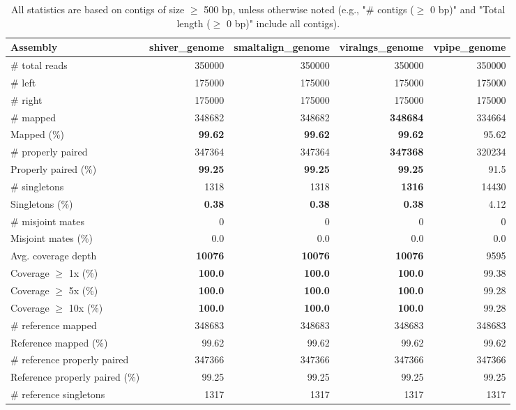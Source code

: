 \documentclass[12pt,a4paper]{article}
\begin{document}
\begin{table}[ht]
\begin{center}
\caption{All statistics are based on contigs of size $\geq$ 500 bp, unless otherwise noted (e.g., "\# contigs ($\geq$ 0 bp)" and "Total length ($\geq$ 0 bp)" include all contigs).}
\begin{tabular}{|l*{4}{|r}|}
\hline
Assembly & shiver\_genome & smaltalign\_genome & viralngs\_genome & vpipe\_genome \\ \hline
\# total reads & 350000 & 350000 & 350000 & 350000 \\ \hline
\# left & 175000 & 175000 & 175000 & 175000 \\ \hline
\# right & 175000 & 175000 & 175000 & 175000 \\ \hline
\# mapped & 348682 & 348682 & {\bf 348684} & 334664 \\ \hline
Mapped (\%) & {\bf 99.62} & {\bf 99.62} & {\bf 99.62} & 95.62 \\ \hline
\# properly paired & 347364 & 347364 & {\bf 347368} & 320234 \\ \hline
Properly paired (\%) & {\bf 99.25} & {\bf 99.25} & {\bf 99.25} & 91.5 \\ \hline
\# singletons & 1318 & 1318 & {\bf 1316} & 14430 \\ \hline
Singletons (\%) & {\bf 0.38} & {\bf 0.38} & {\bf 0.38} & 4.12 \\ \hline
\# misjoint mates & 0 & 0 & 0 & 0 \\ \hline
Misjoint mates (\%) & 0.0 & 0.0 & 0.0 & 0.0 \\ \hline
Avg. coverage depth & {\bf 10076} & {\bf 10076} & {\bf 10076} & 9595 \\ \hline
Coverage $\geq$ 1x (\%) & {\bf 100.0} & {\bf 100.0} & {\bf 100.0} & 99.38 \\ \hline
Coverage $\geq$ 5x (\%) & {\bf 100.0} & {\bf 100.0} & {\bf 100.0} & 99.28 \\ \hline
Coverage $\geq$ 10x (\%) & {\bf 100.0} & {\bf 100.0} & {\bf 100.0} & 99.28 \\ \hline
\# reference mapped & 348683 & 348683 & 348683 & 348683 \\ \hline
Reference mapped (\%) & 99.62 & 99.62 & 99.62 & 99.62 \\ \hline
\# reference properly paired & 347366 & 347366 & 347366 & 347366 \\ \hline
Reference properly paired (\%) & 99.25 & 99.25 & 99.25 & 99.25 \\ \hline
\# reference singletons & 1317 & 1317 & 1317 & 1317 \\ \hline

\end{tabular}
\end{center}
\end{table}
\end{document}
